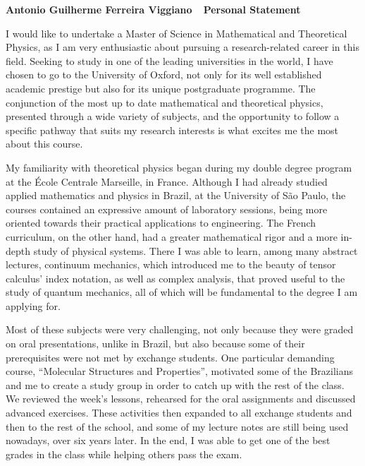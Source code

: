 \documentclass[10pt]{article}
\def\firstname{Antonio Guilherme }
\def\familyname{Ferreira Viggiano}
\def\FileTitle{\firstname\familyname~\textemdash~Personal Statement}
\newcommand*{\NEWLINE}{\vspace{0.75em}}
\begin{document}
\sffamily %

{\bfseries \FileTitle}
\NEWLINE{}\NEWLINE{}

I would like to undertake a Master of Science in Mathematical and Theoretical Physics, as I am very enthusiastic about pursuing a research-related career in this field. Seeking to study in one of the leading universities in the world, I have chosen to go to the University of Oxford, not only for its well established academic prestige but also for its unique postgraduate programme. The conjunction of the most up to date mathematical and theoretical physics, presented through a wide variety of subjects, and the opportunity to follow a specific pathway that suits my research interests is what excites me the most about this course. \NEWLINE{}

My familiarity with theoretical physics began during my double degree program at the École Centrale Marseille, in France. Although I had already studied applied mathematics and physics in Brazil, at the University of São Paulo, the courses contained an expressive amount of laboratory sessions, being more oriented towards their practical applications to engineering. The French curriculum, on the other hand, had a greater mathematical rigor and a more in-depth study of physical systems. There I was able to learn, among many abstract lectures, continuum mechanics, which introduced me to the beauty of tensor calculus' index notation, as well as complex analysis, that proved useful to the study of quantum mechanics, all of which will be fundamental to the degree I am applying for. \NEWLINE{}

Most of these subjects were very challenging, not only because they were graded on oral presentations, unlike in Brazil, but also because some of their prerequisites were not met by exchange students. One particular demanding course, ``Molecular Structures and Properties'', motivated some of the Brazilians and me to create a study group in order to catch up with the rest of the class. We reviewed the week's lessons, rehearsed for the oral assignments and discussed advanced exercises. These activities then expanded to all exchange students and then to the rest of the school, and some of my lecture notes are still being used nowadays, over six years later. In the end, I was able to get one of the best grades in the class while helping others pass the exam. \NEWLINE{}
\end{document}
